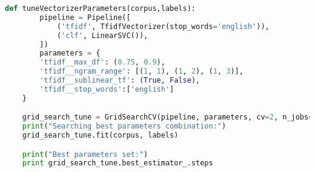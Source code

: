 \newpage
\begin{lstlisting}[caption={Tuning of vectorizer using “GridSearchCV” class },label={lst:vectorizerGridsearchcv},language=Python]
    def tuneVectorizerParameters(corpus,labels):
    	pipeline = Pipeline([
        	('tfidf', TfidfVectorizer(stop_words='english')),
        	('clf', LinearSVC()),
    	])
    	parameters = {
        'tfidf__max_df': (0.75, 0.9),
        'tfidf__ngram_range': [(1, 1), (1, 2), (1, 3)],
        'tfidf__sublinear_tf': (True, False),
        'tfidf__stop_words':['english']
    }

    grid_search_tune = GridSearchCV(pipeline, parameters, cv=2, n_jobs=2, verbose=3)
    print("Searching best parameters combination:")
    grid_search_tune.fit(corpus, labels)

    print("Best parameters set:")
    print grid_search_tune.best_estimator_.steps
\end{lstlisting}

